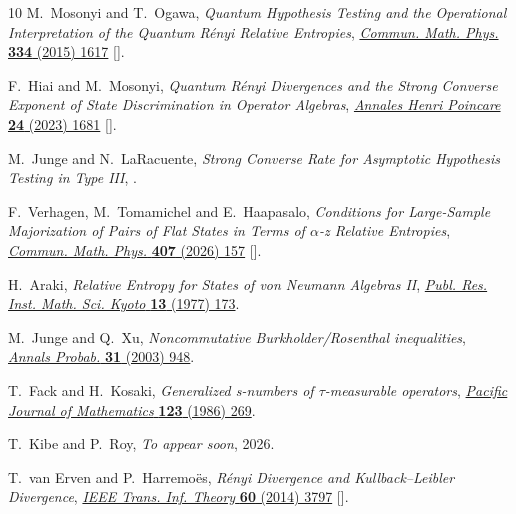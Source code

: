 \documentclass[12pt]{article}
\numberwithin{equation}{section}
\theoremstyle{definition}
\theoremstyle{remark}
\newcommand{\?}{\overset{?}{=}}
\begin{document}
\begin{thebibliography}{10}
M.~Mosonyi and T.~Ogawa, \emph{{Quantum Hypothesis Testing and the Operational
  Interpretation of the Quantum R{\'e}nyi Relative Entropies}},
  \href{https://doi.org/10.1007/s00220-014-2248-x}{\emph{Commun. Math. Phys.}
  {\bfseries 334} (2015) 1617}
  [\href{https://arxiv.org/abs/1309.3228}{{}}].

F.~Hiai and M.~Mosonyi, \emph{{Quantum R{\'e}nyi Divergences and the Strong
  Converse Exponent of State Discrimination in Operator Algebras}},
  \href{https://doi.org/10.1007/s00023-022-01250-5}{\emph{Annales Henri
  Poincare} {\bfseries 24} (2023) 1681}
  [\href{https://arxiv.org/abs/2110.07320}{{}}].

M.~Junge and N.~LaRacuente, \emph{{Strong Converse Rate for Asymptotic
  Hypothesis Testing in Type III}},
  \href{https://arxiv.org/abs/2507.07989}{{}}.

F.~Verhagen, M.~Tomamichel and E.~Haapasalo, \emph{{Conditions for Large-Sample
  Majorization of Pairs of Flat States in Terms of $\alpha $-z Relative
  Entropies}}, \href{https://doi.org/10.1007/s00220-026-05675-5}{\emph{Commun.
  Math. Phys.} {\bfseries 407} (2026) 157}
  [\href{https://arxiv.org/abs/2507.07520}{{}}].

H.~Araki, \emph{{Relative Entropy for States of von Neumann Algebras II}},
  \href{https://doi.org/10.2977/prims/1195190105}{\emph{Publ. Res. Inst. Math.
  Sci. Kyoto} {\bfseries 13} (1977) 173}.

M.~Junge and Q.~Xu, \emph{{Noncommutative Burkholder/Rosenthal inequalities}},
  \href{https://doi.org/10.1214/aop/1048516542}{\emph{Annals Probab.}
  {\bfseries 31} (2003) 948}.

T.~Fack and H.~Kosaki, \emph{Generalized s-numbers of $\tau$-measurable
  operators}, \href{https://doi.org/10.2140/pjm.1986.123.269}{\emph{Pacific
  Journal of Mathematics} {\bfseries 123} (1986) 269}.

T.~Kibe and P.~Roy, \emph{To appear soon},  2026.

T.~van Erven and P.~Harremo{\"e}s, \emph{{R{\'e}nyi Divergence and
  Kullback--Leibler Divergence}},
  \href{https://doi.org/10.1109/TIT.2014.2320500}{\emph{IEEE Trans. Inf.
  Theory} {\bfseries 60} (2014) 3797}
  [\href{https://arxiv.org/abs/1206.2459}{{}}].

\end{thebibliography}\endgroup
\end{document}

